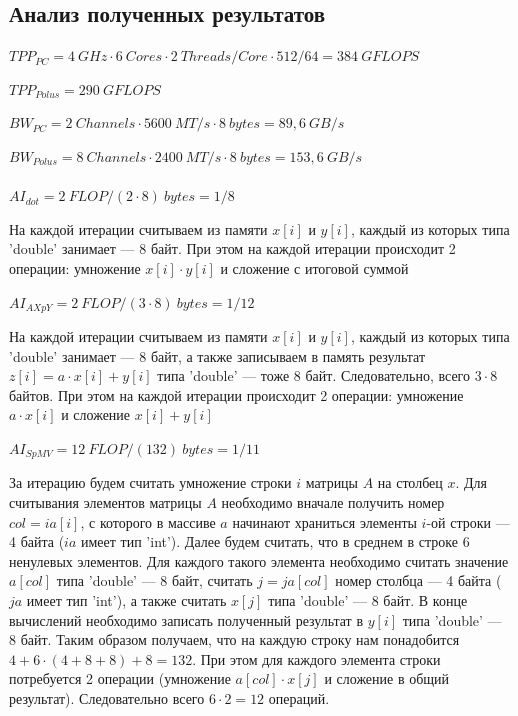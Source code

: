 \documentclass[12pt, a4paper]{article}
\begin{document}
\newpage

\subsection{Анализ полученных результатов}

$ TPP_{PC} = 4\ GHz \cdot 6\ Cores \cdot 2\ Threads/Core \cdot 512/64 = 384\ GFLOPS $ 

$ TPP_{Polus} = 290\ GFLOPS $

$ BW_{PC} = 2\ Channels \cdot 5600\ MT/s \cdot 8\ bytes = 89,6\ GB/s $

$ BW_{Polus} = 8\ Channels \cdot 2400\ MT/s \cdot 8\ bytes = 153,6\ GB/s $ \\ \\

$ AI_{dot} = 2\ FLOP / (2 \cdot 8)\ bytes = 1/8 $

На каждой итерации считываем из памяти $x[i]$ и $y[i]$, каждый из которых типа 'double' занимает --- 8 байт. При этом на каждой итерации происходит 2 операции: умножение $x[i] \cdot y[i]$ и сложение с итоговой суммой

$ AI_{AXpY} = 2\ FLOP / (3 \cdot 8)\ bytes = 1/12 $

На каждой итерации считываем из памяти $x[i]$ и $y[i]$, каждый из которых типа 'double' занимает --- 8 байт, а также записываем в память результат $z[i] = a \cdot x[i] + y[i]$ типа 'double' --- тоже 8 байт. Следовательно, всего $3 \cdot 8$ байтов. При этом на каждой итерации происходит 2 операции: умножение $a \cdot x[i]$ и сложение $x[i] + y[i]$

$ AI_{SpMV} = 12\ FLOP / (132)\ bytes = 1/11 $ 

За итерацию будем считать умножение строки $i$ матрицы $A$ на столбец $x$. Для считывания элементов матрицы $A$ необходимо вначале получить номер $col=ia[i]$, с которого в массиве $a$ начинают храниться элементы $i$-ой строки --- 4 байта ($ia$ имеет тип 'int'). Далее будем считать, что в среднем в строке 6 ненулевых элементов. Для каждого такого элемента необходимо считать значение $a[col]$ типа 'double' --- 8 байт, считать $j = ja[col]$ номер столбца --- 4 байта ($ja$ имеет тип 'int'), а также считать $x[j]$ типа 'double' --- 8 байт. В конце вычислений необходимо записать полученный результат в $y[i]$ типа 'double' --- 8 байт. Таким образом получаем, что на каждую строку нам понадобится $4 + 6 \cdot (4 + 8 + 8) + 8 = 132$. При этом для каждого элемента строки потребуется 2 операции (умножение $a[col] \cdot x[j]$ и сложение в общий результат). Следовательно всего $6 \cdot 2 = 12$ операций.
 \\ \\ 
\end{document}
